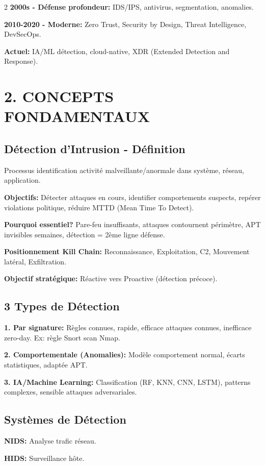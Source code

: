\documentclass[9pt,a4paper]{extarticle}
\begin{document}
\begin{multicols}{2}
\textbf{2000s - Défense profondeur:} IDS/IPS, antivirus, segmentation, anomalies.

\textbf{2010-2020 - Moderne:} Zero Trust, Security by Design, Threat Intelligence, DevSecOps.

\textbf{Actuel:} IA/ML détection, cloud-native, XDR (Extended Detection and Response).

\section*{2. CONCEPTS FONDAMENTAUX}

\subsection*{Détection d'Intrusion - Définition}
Processus identification activité malveillante/anormale dans système, réseau, application.

\textbf{Objectifs:} Détecter attaques en cours, identifier comportements suspects, repérer violations politique, réduire MTTD (Mean Time To Detect).

\textbf{Pourquoi essentiel?} Pare-feu insuffisants, attaques contournent périmètre, APT invisibles semaines, détection = 2ème ligne défense.

\textbf{Positionnement Kill Chain:} Reconnaissance, Exploitation, C2, Mouvement latéral, Exfiltration.

\textbf{Objectif stratégique:} Réactive vers Proactive (détection précoce).

\subsection*{3 Types de Détection}
\textbf{1. Par signature:} Règles connues, rapide, efficace attaques connues, inefficace zero-day. Ex: règle Snort scan Nmap.

\textbf{2. Comportementale (Anomalies):} Modèle comportement normal, écarts statistiques, adaptée APT.

\textbf{3. IA/Machine Learning:} Classification (RF, KNN, CNN, LSTM), patterns complexes, sensible attaques adversariales.

\subsection*{Systèmes de Détection}
\textbf{NIDS:} Analyse trafic réseau.

\textbf{HIDS:} Surveillance hôte.


\end{multicols}
\end{document}
